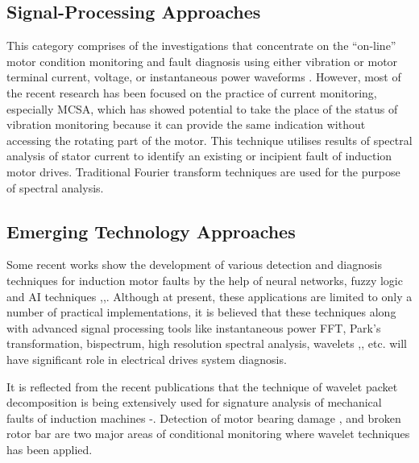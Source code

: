 \documentclass[a4paper,11pt]{article}
\begin{document}
\subsection{Signal-Processing Approaches}
This category comprises of the investigations that concentrate on the ``on-line'' motor condition monitoring and fault diagnosis using either vibration \cite{rps14} or motor terminal current, voltage, or instantaneous power waveforms \cite{pbc6}. However, most of the recent research has been focused on the practice of current monitoring, especially MCSA, which has showed potential to take the place of the status of vibration monitoring \cite{00873206} because it can provide the same indication without accessing the rotating part of the motor. This technique utilises results of spectral analysis of stator current to identify an existing or incipient fault of induction motor drives. Traditional Fourier transform techniques are used for the purpose of spectral analysis.

\subsection{Emerging Technology Approaches}
Some recent works show the development of various detection and diagnosis techniques for induction motor faults by the help of neural networks, fuzzy logic and AI techniques \cite{pbc2},\cite{pbc4},\cite{pbc5}. Although at present, these applications are limited to only a number of practical implementations, it is believed that these techniques along with advanced signal processing tools like instantaneous power FFT, Park's transformation, bispectrum, high resolution spectral analysis, wavelets \cite{00873206},\cite{00952496}, etc. will have significant role in electrical drives system diagnosis.
   
It is reflected from the recent publications that the technique of wavelet packet decomposition is being extensively used for signature analysis of mechanical faults of induction machines \cite{00897122}-\cite{01254628}. Detection of motor bearing damage \cite{01254628},\cite{00929510} and broken rotor bar \cite{00976461} are two major areas of conditional monitoring where wavelet techniques has been applied. 
\end{document}

